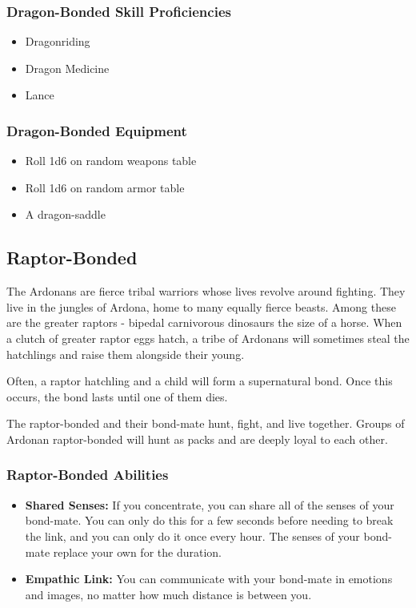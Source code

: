 \begin{multicols}{2}
\subsubsection{Dragon-Bonded Skill Proficiencies}

\begin{itemize}
  \item Dragonriding
  \item Dragon Medicine
  \item Lance
\end{itemize}

\subsubsection{Dragon-Bonded Equipment}

\begin{itemize}
  \item Roll 1d6 on random weapons table
  \item Roll 1d6 on random armor table
  \item A dragon-saddle
\end{itemize}

\subsection{Raptor-Bonded}

The Ardonans are fierce tribal warriors whose lives revolve around
fighting. They live in the jungles of Ardona, home to many equally
fierce beasts. Among these are the greater raptors - bipedal carnivorous
dinosaurs the size of a horse. When a clutch of greater raptor eggs hatch,
a tribe of Ardonans will sometimes steal the hatchlings and raise them
alongside their young.

Often, a raptor hatchling and a child will form a supernatural bond.
Once this occurs, the bond lasts until one of them dies.

The raptor-bonded and their bond-mate hunt, fight, and live together.
Groups of Ardonan raptor-bonded will hunt as packs and are deeply loyal
to each other.

\subsubsection{Raptor-Bonded Abilities}

\begin{itemize}
  \item \textbf{Shared Senses:} If you concentrate, you can share all
    of the senses of your bond-mate. You can only do this for a few seconds
    before needing to break the link, and you can only do it once every hour.
    The senses of your bond-mate replace your own for the duration.
  \item \textbf{Empathic Link:} You can communicate with your bond-mate
    in emotions and images, no matter how much distance is between you.
\end{itemize}


\end{multicols}
